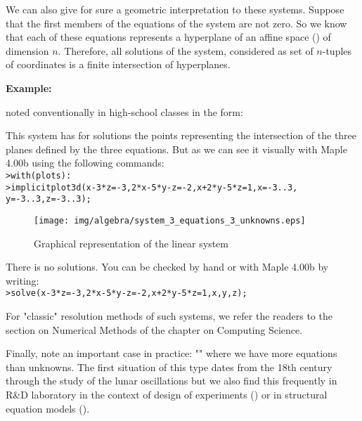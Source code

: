 We can also give for sure a geometric interpretation to these systems. Suppose that the first members of the equations of the system are not zero. So we know that each of these equations represents a hyperplane of an affine space () of dimension $n$. Therefore, all solutions of the system, considered as set of $n$-tuples of coordinates is a finite intersection of hyperplanes.

	\begin{tcolorbox}[colframe=black,colback=white,sharp corners]
	\textbf{{\Large {}}Example:}
	
	noted conventionally in high-school classes in the form:
	
	This system has for solutions the points representing the intersection of the three planes defined by the three equations. But as we can see it visually with Maple 4.00b using the following commands:\\

	\texttt{>with(plots):}\\
	\texttt{>implicitplot3d({x-3*z=-3,2*x-5*y-z=-2,x+2*y-5*z=1},x=-3..3,}
	\texttt{y=-3..3,z=-3..3);}
	
	\begin{figure}[H]
	\centering
	\texttt{[image: img/algebra/system\_3\_equations\_3\_unknowns.eps]}
	\caption{Graphical representation of the linear system}
	\end{figure}
	
	There is no solutions. You can be checked by hand or with Maple 4.00b by writing:\\
	
	\texttt{>solve({x-3*z=-3,2*x-5*y-z=-2,x+2*y-5*z=1},{x,y,z});}
	\end{tcolorbox}

	\begin{tcolorbox}[title=Remark,colframe=black,arc=10pt]
For "classic" resolution methods of such systems, we refer the readers to the section on Numerical Methods of the chapter on Computing Science.
	\end{tcolorbox}	
	
Finally, note an important case in practice: "" where we have more equations than unknowns. The first situation of this type dates from the 18th century through the study of the lunar oscillations but we also find this frequently in R\&D laboratory in the context of design of experiments () or in structural equation models ().

